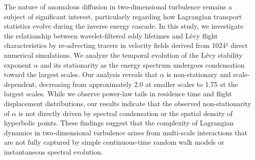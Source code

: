 \documentclass[]{article}
\begin{document}
The nature of anomalous diffusion in two-dimensional turbulence remains a subject of significant interest, particularly regarding how Lagrangian transport statistics evolve during the inverse energy cascade. In this study, we investigate the relationship between wavelet-filtered eddy lifetimes and Lévy flight characteristics by re-advecting tracers in velocity fields derived from 1024² direct numerical simulations. We analyze the temporal evolution of the Lévy stability exponent $\alpha$ and its stationarity as the energy spectrum undergoes condensation toward the largest scales. Our analysis reveals that $\alpha$ is non-stationary and scale-dependent, decreasing from approximately 2.0 at smaller scales to 1.75 at the largest scales. While we observe power-law tails in residence time and flight displacement distributions, our results indicate that the observed non-stationarity of $\alpha$ is not directly driven by spectral condensation or the spatial density of hyperbolic points. These findings suggest that the complexity of Lagrangian dynamics in two-dimensional turbulence arises from multi-scale interactions that are not fully captured by simple continuous-time random walk models or instantaneous spectral evolution.
\end{document}
